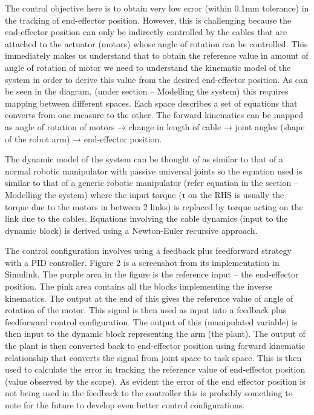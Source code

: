\documentclass[a4paper,12pt]{article}
\begin{document}
The control objective here is to obtain very low error (within  0.1mm tolerance) in the tracking of end-effector position. However, this is challenging because the end-effector position can only be indirectly controlled by the cables that are attached to the actuator (motors) whose angle of rotation can be controlled. This immediately makes us understand that to obtain the reference value in amount of angle of rotation of motor we need to understand the kinematic model of the system in order to derive this value from the desired end-effector position. As can be seen in the diagram, (under section – Modelling the system) this requires mapping between different spaces. Each space describes a set of equations that converts from one measure to the other. The forward kinematics can be mapped as angle of rotation of motors → change in length of cable → joint angles (shape of the robot arm) → end-effector position. 

The dynamic model of the system can be thought of as similar to that of a normal robotic manipulator with passive universal joints so the equation used is similar to that of a generic robotic manipulator (refer equation in the section – Modelling the system) where the input torque (τ on the RHS is usually the torque due to the motors in between 2 links) is replaced by torque acting on the link due to the cables. Equations involving the cable dynamics (input to the dynamic block) is derived using a Newton-Euler recursive approach.

The control configuration involves using a feedback plus feedforward strategy with a PID controller. Figure 2 is a screenshot from its implementation in Simulink. The purple area in the figure is the reference input – the end-effector position. The pink area contains all the blocks implementing the inverse kinematics. The output at the end of this gives the reference value of angle of rotation of the motor. This signal is then used as input into a feedback plus feedforward control configuration. The output of this (manipulated variable) is then input to the dynamic block representing the arm (the plant). The output of the plant is then converted back to end-effector position using forward kinematic relationship that converts the signal from joint space to task space. This is then used to calculate the error in tracking the reference value of end-effector position (value observed by the scope). As evident the error of the end effector position is not being used in the feedback to the controller this is probably something to note for the future to develop even better control configurations.
\end{document}

